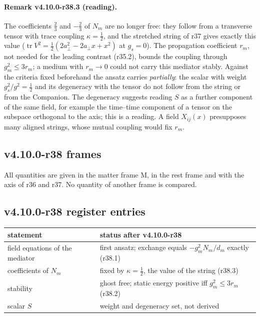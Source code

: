 \paragraph{Remark v4.10.0-r38.3 (reading).}
The coefficients \(\tfrac23\) and \(-\tfrac23\) of \(N_m\) are no longer free: they follow from a transverse tensor with trace coupling \(\kappa=\tfrac12\), and
the stretched string of r37 gives exactly this value (\(\operatorname{tr}V^2=\tfrac12(2a_\perp^2-2a_\perp x+x^2)\) at \(g_s=0\)).  The propagation
coefficient \(r_m\), not needed for the leading contrast (r35.2), bounds the coupling through \(g_m^2\le3r_m\); a medium with \(r_m\to0\) could not
carry this mediator stably.  Against the criteria fixed beforehand the ansatz carries \emph{partially}: the scalar with weight \(g_s^2/g^2=\tfrac12\)
and its degeneracy with the tensor do not follow from the string or from the Companion.  The degeneracy suggests reading \(S\) as a further
component of the same field, for example the time--time component of a tensor on the subspace orthogonal to the axis; this is a reading.  A
field \(X_{ij}(x)\) presupposes many aligned strings, whose mutual coupling would fix \(r_m\).

\subsection*{v4.10.0-r38 frames}
\label{subsec:v4100-r38-frames}

All quantities are given in the matter frame M, in the rest frame and with the axis of r36 and r37.  No quantity of another frame is compared.

\subsection*{v4.10.0-r38 register entries}
\label{subsec:v4100-r38-register}

\begin{center}
\small
\begin{tabular}{@{}>{\raggedright\arraybackslash}p{}>{\raggedright\arraybackslash}p{}@{}}
\toprule
statement & status after v4.10.0-r38\\
\midrule
field equations of the mediator & first ansatz; exchange equals \(-g_m^2N_m/d_m\) exactly (r38.1)\\
coefficients of \(N_m\) & fixed by \(\kappa=\tfrac12\), the value of the string (r38.3)\\
stability & ghost free; static energy positive iff \(g_m^2\le3r_m\) (r38.2)\\
scalar \(S\) & weight and degeneracy set, not derived\\
\bottomrule
\end{tabular}
\end{center}

